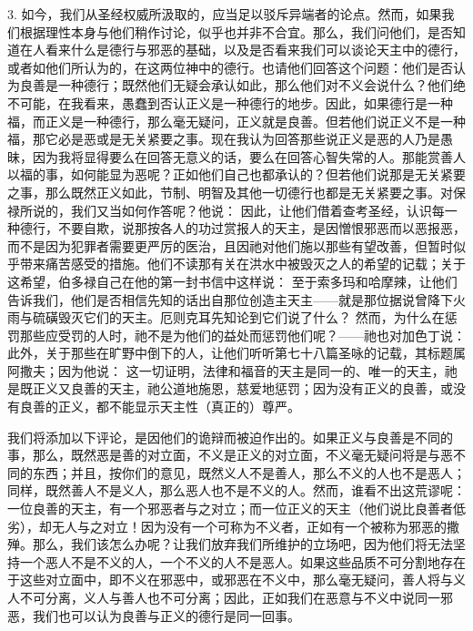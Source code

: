 3. 如今，我们从圣经权威所汲取的，应当足以驳斥异端者的论点。然而，如果我们根据理性本身与他们稍作讨论，似乎也并非不合宜。那么，我们问他们，是否知道在人看来什么是德行与邪恶的基础，以及是否看来我们可以谈论天主中的德行，或者如他们所认为的，在这两位神中的德行。也请他们回答这个问题：他们是否认为良善是一种德行；既然他们无疑会承认如此，那么他们对不义会说什么？他们绝不可能，在我看来，愚蠢到否认正义是一种德行的地步。因此，如果德行是一种福，而正义是一种德行，那么毫无疑问，正义就是良善。但若他们说正义不是一种福，那它必是恶或是无关紧要之事。现在我认为回答那些说正义是恶的人乃是愚昧，因为我将显得要么在回答无意义的话，要么在回答心智失常的人。那能赏善人以福的事，如何能显为恶呢？正如他们自己也都承认的？但若他们说那是无关紧要之事，那么既然正义如此，节制、明智及其他一切德行也都是无关紧要之事。对保禄所说的，我们又当如何作答呢？他说： 因此，让他们借着查考圣经，认识每一种德行，不要自欺，说那按各人的功过赏报人的天主，是因憎恨邪恶而以恶报恶，而不是因为犯罪者需要更严厉的医治，且因祂对他们施以那些有望改善，但暂时似乎带来痛苦感受的措施。他们不读那有关在洪水中被毁灭之人的希望的记载；关于这希望，伯多禄自己在他的第一封书信中这样说： 至于索多玛和哈摩辣，让他们告诉我们，他们是否相信先知的话出自那位创造主天主——就是那位据说曾降下火雨与硫磺毁灭它们的天主。厄则克耳先知论到它们说了什么？ 然而，为什么在惩罚那些应受罚的人时，祂不是为他们的益处而惩罚他们呢？——祂也对加色丁说： 此外，关于那些在旷野中倒下的人，让他们听听第七十八篇圣咏的记载，其标题属阿撒夫；因为他说： 这一切证明，法律和福音的天主是同一的、唯一的天主，祂是既正义又良善的天主，祂公道地施恩，慈爱地惩罚；因为没有正义的良善，或没有良善的正义，都不能显示天主性（真正的）尊严。\newline{}\par

我们将添加以下评论，是因他们的诡辩而被迫作出的。如果正义与良善是不同的事，那么，既然恶是善的对立面，不义是正义的对立面，不义毫无疑问将是与恶不同的东西；并且，按你们的意见，既然义人不是善人，那么不义的人也不是恶人；同样，既然善人不是义人，那么恶人也不是不义的人。然而，谁看不出这荒谬呢：一位良善的天主，有一个邪恶者与之对立；而一位正义的天主（他们说比良善者低劣），却无人与之对立！因为没有一个可称为不义者，正如有一个被称为邪恶的撒殚。那么，我们该怎么办呢？让我们放弃我们所维护的立场吧，因为他们将无法坚持一个恶人不是不义的人，一个不义的人不是恶人。如果这些品质不可分割地存在于这些对立面中，即不义在邪恶中，或邪恶在不义中，那么毫无疑问，善人将与义人不可分离，义人与善人也不可分离；因此，正如我们在恶意与不义中说同一邪恶，我们也可以认为良善与正义的德行是同一回事。\newline{}\par

